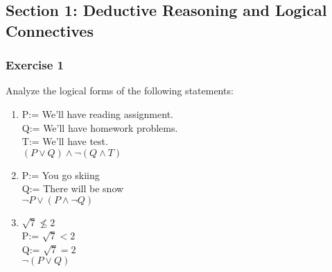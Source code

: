 \subsection{Section 1: Deductive Reasoning and Logical Connectives}

\subsubsection{Exercise 1}

\question Analyze the logical forms of the following statements:

\begin{solution}
    \begin{enumerate}[label=(\alph*)]
        \item P:= We'll have reading assignment. \;\\
                Q:= We'll have homework problems. \\
                T:= We'll have test. \\
                $(P \vee Q) \wedge \neg(Q \wedge T)$
                
        \item P:= You go skiing \\
                Q:= There will be snow \\
                $\neg P \vee (P \wedge \neg Q)$
        \item $\sqrt{7} \nleq 2$ \\
                P:= $\sqrt{7} < 2$ \\
                Q:= $\sqrt{7} = 2$ \\
                $\neg (P \vee Q)$
    \end{enumerate}
\end{solution}

